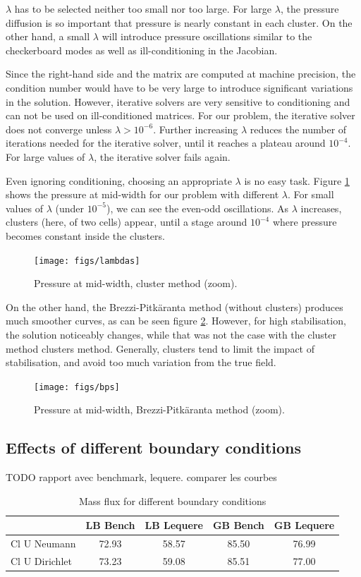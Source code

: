 \documentclass[12pt]{article}
\begin{document}
$\lambda$ has to be selected neither too small nor too large. For
large $\lambda$, the pressure diffusion is so important that pressure
is nearly constant in each cluster. On the other hand, a small
$\lambda$ will introduce pressure oscillations similar to the
checkerboard modes as well as ill-conditioning in the Jacobian.

Since the right-hand side and the matrix are computed at machine
precision, the condition number would have to be very large to
introduce significant variations in the solution. However, iterative
solvers are very sensitive to conditioning and can not be used on
ill-conditioned matrices. For our problem, the iterative solver does
not converge unless $\lambda > 10^{-6}$. Further increasing $\lambda$
reduces the number of iterations needed for the iterative solver,
until it reaches a plateau around $10^{-4}$. For large values of
$\lambda$, the iterative solver fails again.

Even ignoring conditioning, choosing an appropriate $\lambda$ is no
easy task. Figure \ref{fig:lambdas} shows the pressure at mid-width
for our problem with different $\lambda$. For small values of
$\lambda$ (under $10^{-5}$), we can see the even-odd oscillations. As
$\lambda$ increases, clusters (here, of two cells) appear, until a
stage around $10^{-4}$ where pressure becomes constant inside the
clusters.

\begin{figure}[htb]
\centering
\texttt{[image: figs/lambdas]}
\caption{Pressure at mid-width, cluster method (zoom).}
\label{fig:lambdas}
\end{figure}

On the other hand, the Brezzi-Pitk\"aranta method (without clusters)
produces much smoother curves, as can be seen figure
\ref{fig:bps}. However, for high stabilisation, the solution
noticeably changes, while that was not the case with the cluster
method clusters method. Generally, clusters tend to limit the impact
of stabilisation, and avoid too much variation from the true field.

\begin{figure}[htb]
\centering
\texttt{[image: figs/bps]}
\caption{Pressure at mid-width, Brezzi-Pitk\"aranta method (zoom).}
\label{fig:bps}
\end{figure}
\subsection{Effects of different boundary conditions}
\label{effect-bc}
TODO rapport avec benchmark, lequere. comparer les courbes
\begin{table}[!h]
  \centering
  \begin{tabular}{|l|c|c|c|c|}
    \hline
    & LB Bench & LB Lequere & GB Bench & GB Lequere \\
    \hline
    Cl U Neumann & 72.93 & 58.57 & 85.50 & 76.99\\
    Cl U Dirichlet & 73.23 & 59.08 & 85.51 & 77.00 \\
    \hline
  \end{tabular}
  \caption{Mass flux for different boundary conditions}
\end{table}
\end{document}
